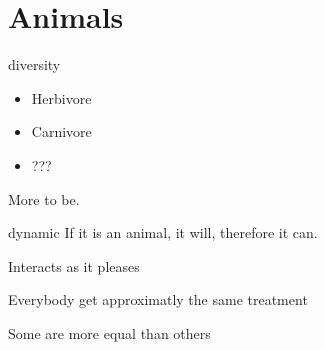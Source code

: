 \section{Animals}


\begin{frame}{diversity}
	\begin{itemize}[<+->]
		\item Herbivore
		\item Carnivore 
		\item ??? 
	\end{itemize}
	\pause[3] More to be.
\end{frame}

\begin{frame}{dynamic}
	If it is an animal, it will, therefore it can.
	
	\pause Interacts as it pleases

	\pause Everybody get approximatly the same treatment

	\pause Some are more equal than others
\end{frame}